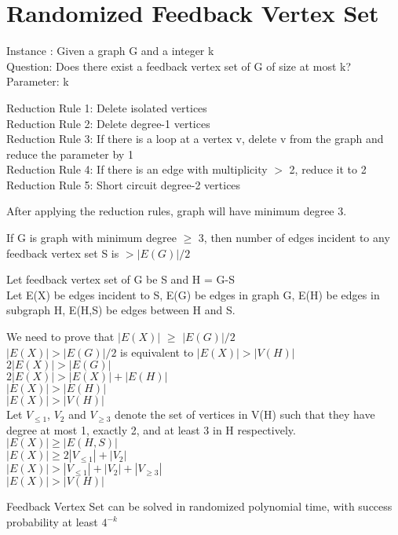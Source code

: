 \section{Randomized Feedback Vertex Set}
Instance : Given a graph G and a integer k \\
Question: Does there exist a feedback vertex set of G of size at most k? \\
Parameter: k

Reduction Rule 1: Delete isolated vertices \\
Reduction Rule 2: Delete degree-1 vertices \\
Reduction Rule 3: If there is a loop at a vertex v, delete v from the graph
and reduce the parameter by 1 \\
Reduction Rule 4: If there is an edge with multiplicity $>$ 2, reduce it to 2 \\
Reduction Rule 5: Short circuit degree-2 vertices 

After applying the reduction rules, graph will have minimum degree 3.

If G is graph with minimum degree $\geq$ 3, then number of edges
incident to any feedback vertex set S is $> |E(G)|/2$

Let feedback vertex set of G be S and H = G-S \\
Let E(X) be edges incident to S, E(G) be edges in graph G, E(H) be edges in subgraph H, 
E(H,S) be edges between H and S.

We need to prove that $|E(X)|$ $\geq$ $|E(G)|/2$ \\
$|E(X)| >  |E(G)|/2$ is equivalent to $|E(X)| > |V(H)|$ \\
$2|E(X)| > |E(G)| $ \\
$2|E(X)| > |E(X)|+|E(H)| $ \\
$|E(X)| > |E(H)| $ \\
$|E(X)| > |V(H)|$ \\

Let $V_{\leq 1}$, $V_2$ and $V_{\geq 3}$ denote the set of vertices in V(H) such that they
have degree at most 1, exactly 2, and at least 3 in H respectively. \\
$|E(X)| \geq |E(H,S)|$ \\
$|E(X)| \geq 2|V_{\leq 1}| + |V_2|$ \\
$|E(X)| > |V_{\leq 1}| + |V_2| + |V_{\geq 3}|$ \\
$|E(X)| > |V(H)|$ 

Feedback Vertex Set can be solved in randomized polynomial
time, with success probability at least $4^{-k}$

